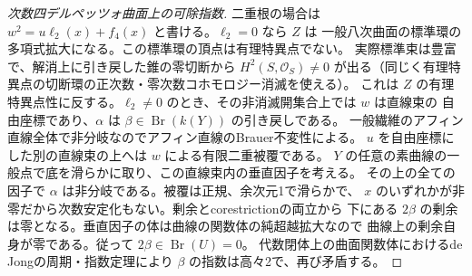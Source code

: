 \begin{proof}[次数四デルペッツォ曲面上の可除指数]
二重根の場合は $w^2=u\ell_2(x)+f_4(x)$ と書ける。$\ell_2=0$ なら $Z$ は
一般八次曲面の標準環の多項式拡大になる。この標準環の頂点は有理特異点でない。
実際標準束は豊富で、解消上に引き戻した錐の零切断から
$H^2(S,\mathcal O_S)\ne0$ が出る（同じく有理特異点の切断環の正次数・零次数コホモロジー消滅を使える）。
これは $Z$ の有理特異点性に反する。$\ell_2\ne0$ のとき、その非消滅開集合上では $w$ は直線束の
自由座標であり、$\alpha$ は $\beta\in\operatorname{Br}(k(Y))$ の引き戻しである。
一般繊維のアフィン直線全体で非分岐なのでアフィン直線のBrauer不変性による。
$u$ を自由座標にした別の直線束の上へは $w$ による有限二重被覆である。
$Y$ の任意の素曲線の一般点で底を滑らかに取り、この直線束内の垂直因子を考える。
その上の全ての因子で $\alpha$ は非分岐である。被覆は正規、余次元1で滑らかで、
$x$ のいずれかが非零だから次数安定化もない。剰余とcorestrictionの両立から
下にある $2\beta$ の剰余は零となる。垂直因子の体は曲線の関数体の純超越拡大なので
曲線上の剰余自身が零である。従って $2\beta\in\operatorname{Br}(U)=0$。
代数閉体上の曲面関数体におけるde Jongの周期・指数定理により $\beta$ の指数は高々2で、再び矛盾する。
\end{proof}

